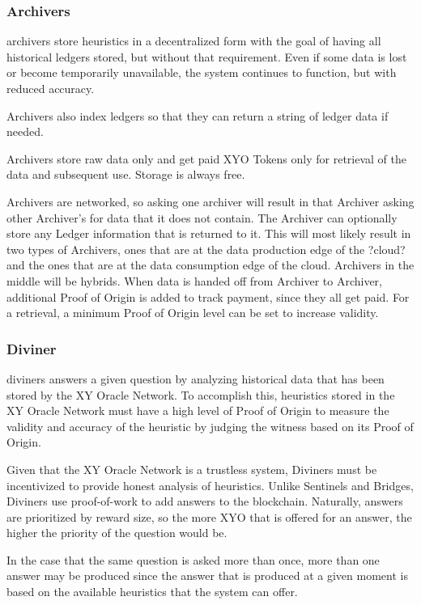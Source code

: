 \documentclass{article}
\begin{document}
\subsubsection {Archivers}
\Glspl{archiver} store heuristics in a decentralized form with the goal of having all historical ledgers stored, but without that requirement.  Even if some data is lost or become temporarily unavailable, the system continues to function, but with reduced accuracy.

Archivers also index ledgers so that they can return a string of ledger data if needed.

Archivers store raw data only and get paid XYO Tokens only for retrieval of the data and subsequent use. Storage is always free.

Archivers are networked, so asking one \gls{archiver} will result in that Archiver asking other Archiver's for data that it does not contain. The Archiver can optionally store any Ledger information that is returned to it. This will most likely result in two types of Archivers, ones that are at the data production edge of the ?cloud? and the ones that are at the data consumption edge of the cloud. Archivers in the middle will be hybrids.  When data is handed off from Archiver to Archiver, additional Proof of Origin is added to track payment, since they all get paid. For a retrieval, a minimum Proof of Origin level can be set to increase validity.

\subsubsection {Diviner}
\Glspl{diviner} answers a given question by analyzing historical data that has been stored by the XY Oracle Network.  To accomplish this, heuristics stored in the XY Oracle Network must have a high level of Proof of Origin to measure the validity and accuracy of the heuristic by judging the witness based on its Proof of Origin.

Given that the XY Oracle Network is a trustless system, Diviners must be incentivized to provide honest analysis of heuristics.  Unlike Sentinels and Bridges, Diviners use \gls{proof-of-work} to add answers to the blockchain.  Naturally, answers are prioritized by reward size, so the more XYO that is offered for an answer, the higher the priority of the question would be.

In the case that the same question is asked more than once, more than one answer may be produced since the answer that is produced at a given moment is based on the available heuristics that the system can offer.
\end{document}
